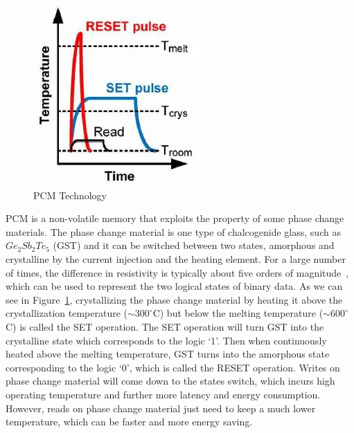 \begin{figure}[!t]
\centering
\includegraphics[scale=0.8]{figs/pcm.jpg}
\caption{PCM Technology}
\label{fig:pcm}
\end{figure}

PCM is a non-volatile memory that exploits the property of some phase change materials. The phase change material is one type of chalcogenide glass, such as $Ge_{2}Sb_{2}Te_{5}$ (GST) and it can be switched between two states, amorphous and crystalline by the current injection and the heating element. For a large number of times, the difference in resistivity is typically about five orders of magnitude~\cite{raoux2008phase}, which can be used to represent the two logical states of binary data. As we can see in Figure~\ref{fig:pcm}\cite{wong2010phase}, crystallizing the phase change material by heating it above the crystallization temperature ($\sim300^{\circ}$C) but below the melting temperature ($\sim600^{\circ}$C) is called the SET operation. The SET operation will turn GST into the crystalline state which corresponds to the logic `1'. Then when continuously heated above the melting temperature, GST turns into the amorphous state corresponding to the logic `0', which is called the RESET operation. Writes on phase change material will come down to the states switch, which incurs high operating temperature and further more latency and energy consumption. However, reads on phase change material just need to keep a much lower temperature, which can be faster and more energy saving.




